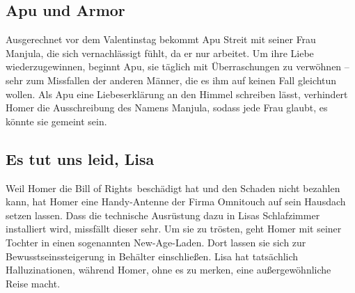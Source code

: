 \subsection{Apu und Armor}\label{AABF11}
Ausgerechnet vor dem Valentinstag bekommt Apu Streit mit seiner Frau Manjula, die sich vernachlässigt fühlt, da er nur arbeitet. Um ihre Liebe wiederzugewinnen, beginnt Apu, sie täglich mit Überraschungen zu verwöhnen -- sehr zum Missfallen der anderen Männer, die es ihm auf keinen Fall gleichtun wollen. Als Apu eine Liebeserklärung an den Himmel schreiben lässt, verhindert Homer die Ausschreibung des Namens Manjula, sodass jede Frau glaubt, es könnte sie gemeint sein.


	
\subsection{Es tut uns leid, Lisa}
Weil Homer die \glqq Bill of Rights\grqq\ beschädigt hat und den Schaden nicht bezahlen kann, hat Homer eine Handy-Antenne der Firma Omnitouch auf sein Hausdach setzen lassen. Dass die technische Ausrüstung dazu in Lisas Schlafzimmer installiert wird, missfällt dieser sehr. Um sie zu trösten, geht Homer mit seiner Tochter in einen sogenannten New-Age-Laden. Dort lassen sie sich zur Bewusstseinssteigerung in Behälter einschließen. Lisa hat tatsächlich Halluzinationen, während Homer, ohne es zu merken, eine außergewöhnliche Reise macht.

